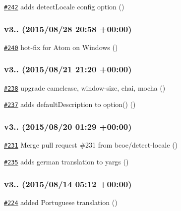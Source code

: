 \begin{DoxyItemize}
\item \href{https://github.com/bcoe/yargs/pull/242}{\tt \#242} adds detect\+Locale config option ()
\end{DoxyItemize}

\subsubsection*{v3.. (2015/08/28 20\+:58 +00\+:00)}


\begin{DoxyItemize}
\item \href{https://github.com/bcoe/yargs/pull/240}{\tt \#240} hot-\/fix for Atom on Windows ()
\end{DoxyItemize}

\subsubsection*{v3.. (2015/08/21 21\+:20 +00\+:00)}


\begin{DoxyItemize}
\item \href{https://github.com/bcoe/yargs/pull/238}{\tt \#238} upgrade camelcase, window-\/size, chai, mocha ()
\item \href{https://github.com/bcoe/yargs/pull/237}{\tt \#237} adds default\+Description to option() ()
\end{DoxyItemize}

\subsubsection*{v3.. (2015/08/20 01\+:29 +00\+:00)}


\begin{DoxyItemize}
\item \href{https://github.com/bcoe/yargs/pull/231}{\tt \#231} Merge pull request \#231 from bcoe/detect-\/locale ()
\item \href{https://github.com/bcoe/yargs/pull/235}{\tt \#235} adds german translation to yargs ()
\end{DoxyItemize}

\subsubsection*{v3.. (2015/08/14 05\+:12 +00\+:00)}


\begin{DoxyItemize}
\item \href{https://github.com/bcoe/yargs/pull/224}{\tt \#224} added Portuguese translation ()
\end{DoxyItemize}

